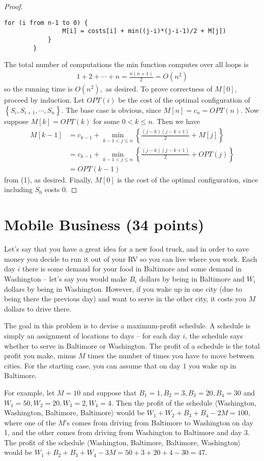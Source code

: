 \documentclass{article}
\begin{document}
\begin{proof}
\begin{Verbatim}[tabsize=4]
			for (i from n-1 to 0) {
				M[i] = costs[i] + min((j-i)*(j-i-1)/2 + M[j])
			}
		}
	\end{Verbatim}
	The total number of computations the min function computes over all loops is
	\begin{align*}
		1+2+\cdots+n = \frac{n(n+1)}{2} = O(n^2)
	\end{align*}
	so the running time is $O(n^2),$ as desired. To prove correctness of $M[0],$ proceed by induction. Let $OPT(i)$ be the cost of the optimal configuration of $\left\{ S_i, S_{i+1}, \cdots, S_n \right\}.$ The base case is obvious, since $M[n]=c_n=OPT(n).$ Now suppose $M[k] = OPT(k)$ for some $0 <k\le n.$ Then we have
	\begin{align*}
		M[k-1] &= c_{k-1} + \min_{k-1<j\le n} \left\{ \frac{(j-k)(j-k+1)}{2} + M[j] \right\} \\
		&= c_{k-1} + \min_{k-1<j\le n} \left\{ \frac{(j-k)(j-k+1)}{2} + OPT(j) \right\} \\
		&= OPT(k-1)
	\end{align*}
	from (1), as desired. Finally, $M[0]$ is the cost of the optimal configuration, since including $S_0$ costs 0.
\end{proof}

\section{Mobile Business (34 points)}

Let's say that you have a great idea for a new food truck, and in order to save money you decide to run it out of your RV so you can live where you work.  Each day $i$ there is some demand for your food in Baltimore and some demand in Washington -- let's say you would make $B_i$ dollars by being in Baltimore and $W_i$ dollars by being in Washington.  However, if you wake up in one city (due to being there the previous day) and want to serve in the other city, it costs you $M$ dollars to drive there.  

The goal in this problem is to devise a maximum-profit schedule.  A schedule is simply an assignment of locations to days -- for each day $i$, the schedule says whether to serve in Baltimore or Washington.  The profit of a schedule is the total profit you make, minus $M$ times the number of times you have to move between cities.  For the starting case, you can assume that on day $1$ you wake up in Baltimore.

For example, let $M = 10$ and suppose that $B_1 = 1, B_2 = 3, B_3 = 20, B_4 = 30$ and $W_1 = 50, W_2 = 20, W_3 = 2, W_4 = 4$.  Then the profit of the schedule $\langle$Washington, Washington, Baltimore, Baltimore$\rangle$ would be $W_1 + W_2 + B_3 + B_4 - 2M = 100$, where one of the $M$'s comes from driving from Baltimore to Washington on day 1, and the other comes from driving from Washington to Baltimore and day 3.  The profit of the schedule $\langle$Washington, Baltimore, Baltimore, Washington$\rangle$ would be $W_1 + B_2 + B_3 + W_4 - 3M = 50 +3 + 20 + 4 - 30 = 47$.
\end{document}
